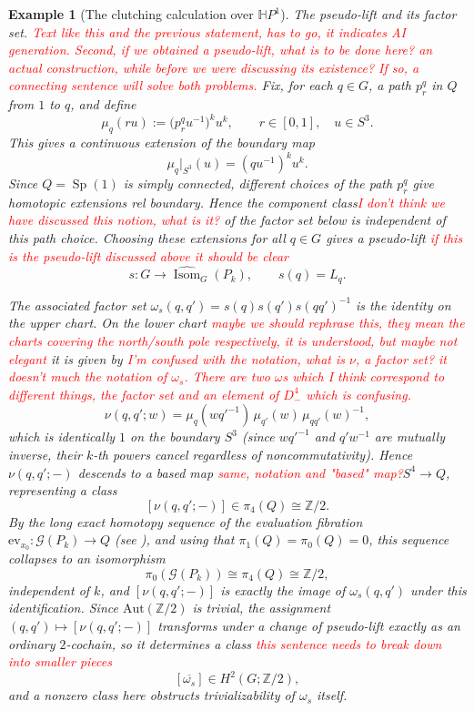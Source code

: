 \documentclass[11pt,a4paper]{article}
\numberwithin{equation}{section}
\newtheorem{example}[definition]{Example}
\theoremstyle{named}
\begin{document}
\begin{example}[The clutching calculation over $\mathbb{H}P^1$]
\emph{The pseudo-lift and its factor set.} \textcolor{red}{Text like this and the previous statement, has to go, it indicates AI generation. Second, if we obtained a pseudo-lift, what is to be done here? an actual construction, while before we were discussing its existence? If so, a connecting sentence will solve both problems.}
Fix, for each \(q\in G\), a path \(p^q_r\) in \(Q\) from \(1\) to \(q\), and define
\[
\mu_q(ru) := \bigl(p^q_r u^{-1}\bigr)^k u^k, \qquad r\in[0,1], \quad u\in S^3.
\]
This gives a continuous extension of the boundary map
\[
\mu_q|_{S^3}(u)=(qu^{-1})^k u^k.
\]
Since \(Q=\operatorname{Sp}(1)\) is simply connected, different choices of the path \(p^q_r\) give homotopic extensions rel boundary. Hence the component class\textcolor{red}{I don't think we have discussed this notion, what is it?} of the factor set below is independent of this path choice. Choosing these extensions for all \(q\in G\) gives a pseudo-lift \textcolor{red}{if this is the pseudo-lift discussed above it should be clear}
\[
s:G\longrightarrow \widehat{\operatorname{Isom}}_G(P_k), \qquad s(q)=L_q.
\]

The associated factor set $\omega_s(q,q') = s(q)s(q')s(qq')^{-1}$ is the identity on the upper chart. On the lower chart \textcolor{red}{maybe we should rephrase this, they mean the charts covering the north/south pole respectively, it is understood, but maybe not elegant} it is given by \textcolor{red}{I'm confused with the notation, what is $\nu$, a factor set? it doesn't much the notation of $\omega_s$. There are two $\omega$s which I think correspond to different things, the factor set and an element of $D^4_-$ which is confusing.}
\[
\nu(q,q';w) = \mu_q(wq'^{-1})\,\mu_{q'}(w)\,\mu_{qq'}(w)^{-1},
\]
which is identically $1$ on the boundary $S^3$ (since $wq'^{-1}$ and $q'w^{-1}$ are mutually inverse, their $k$-th powers cancel regardless of noncommutativity). Hence $\nu(q,q';-)$ descends to a based map \textcolor{red}{same, notation and "based" map?}$S^4 \to Q$, representing a class
\[
[\nu(q,q';-)] \in \pi_4(Q) \cong \mathbb{Z}/2.
\]
By the long exact homotopy sequence of the evaluation fibration $\mathrm{ev}_{x_0} : \mathcal{G}(P_k) \to Q$ (see  \cite{Kono91}), and using that $\pi_1(Q) = \pi_0(Q) = 0$, this sequence collapses to an isomorphism
\[
\pi_0(\mathcal{G}(P_k)) \cong \pi_4(Q) \cong \mathbb{Z}/2,
\]
independent of $k$, and $[\nu(q,q';-)]$ is exactly the image of $\omega_s(q,q')$ under this identification. Since $\mathrm{Aut}(\mathbb{Z}/2)$ is trivial, the assignment $(q,q') \mapsto [\nu(q,q';-)]$ transforms under a change of pseudo-lift exactly as an ordinary $2$-cochain, so it determines a class \textcolor{red}{this sentence needs to break down into smaller pieces}
\[
[\overline{\omega_s}] \in H^2(G; \mathbb{Z}/2),
\]
and a nonzero class here obstructs trivializability of $\omega_s$ itself.


\end{example}
\end{document}
